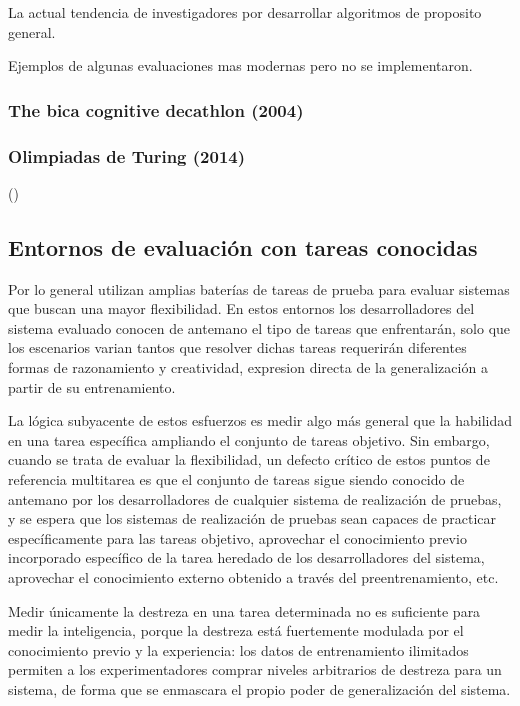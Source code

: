 La actual tendencia de investigadores por desarrollar algoritmos de proposito general.  

Ejemplos de algunas evaluaciones mas modernas pero no se implementaron.

\subsubsection{The bica cognitive decathlon (2004)}

\subsubsection{Olimpiadas de Turing (2014)}

(\cite{beyret2019animal})


\subsection{Entornos de evaluación con tareas conocidas}\label{section:state-of-the-art:inteligence-evaluation-enviroments:evaluation-enviroments-with-know-tasks}

Por lo general utilizan amplias baterías de tareas de prueba para evaluar sistemas que buscan una mayor flexibilidad. En estos entornos los desarrolladores del sistema evaluado conocen de antemano el tipo de tareas que enfrentarán, solo que los escenarios varian tantos que resolver dichas tareas requerirán diferentes formas de razonamiento y creatividad, expresion directa de la generalización a partir de su entrenamiento.

La lógica subyacente de estos esfuerzos es medir algo más general que la habilidad en una tarea específica ampliando el conjunto de tareas objetivo. Sin embargo, cuando se trata de evaluar la flexibilidad, un defecto crítico de estos puntos de referencia multitarea es que el conjunto de tareas sigue siendo conocido de antemano por los desarrolladores de cualquier sistema de realización de pruebas, y se espera que los sistemas de realización de pruebas sean capaces de practicar específicamente para las tareas objetivo, aprovechar el conocimiento previo incorporado específico de la tarea heredado de los desarrolladores del sistema, aprovechar el conocimiento externo obtenido a través del preentrenamiento, etc.

Medir únicamente la destreza en una tarea determinada no es suficiente para medir la inteligencia, porque la destreza está fuertemente modulada por el conocimiento previo y la experiencia: los datos de entrenamiento ilimitados permiten a los experimentadores comprar niveles arbitrarios de destreza para un sistema, de forma que se enmascara el propio poder de generalización del sistema.

